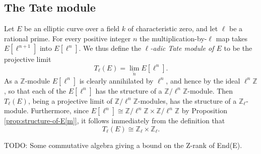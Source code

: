 \subsection{The Tate module}
\label{sec:tate-module}

Let $E$ be an elliptic curve over a field $k$ of characteristic zero, and let $\ell$
be a rational prime.  For every positive integer $n$ the multiplication-by-$\ell$ map
takes $E[\ell^{n+1}]$ into $E[\ell^{n}]$.  We thus define the \emph{$\ell$-adic Tate
  module of $E$} to be the projective limit
\begin{equation*}
  T_{\ell}(E) =  \lim_{\overleftarrow{n}} E[\mathcal{\ell}^{n}].
\end{equation*}
As a $\mathbb{Z}$-module $E[\ell^{n}]$ is clearly annihilated by $\ell^{n}$, and
hence by the ideal $\ell^{n}\mathbb{Z}$, so that each of the $E[\ell^{n}]$ has the
structure of a $\mathbb{Z}/\ell^{n}\mathbb{Z}$-module.  Then $T_{\ell}(E)$, being a
projective limit of $\mathbb{Z}/\ell^{n}\mathbb{Z}$-modules, has the structure of a
$\mathbb{Z}_{\ell}$-module.  Furthermore, since $E[\ell^{n}] \cong
\mathbb{Z}/\ell^{n}\mathbb{Z} \times \mathbb{Z}/\ell^{n}\mathbb{Z}$ by Proposition
\ref{prop:structure-of-E[m]}, it follows immediately from the definition that
\begin{equation*}
  T_{\ell}(E) \cong \mathbb{Z}_{\ell} \times \mathbb{Z}_{\ell}.
\end{equation*}

TODO: Some commutative algebra giving a bound on the Z-rank of End(E).


